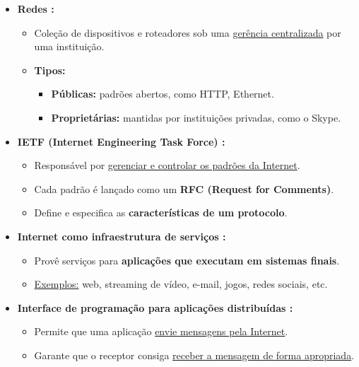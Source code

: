 \begin{itemize}[left=0.5cm, align=left, nosep]
        \item \textbf{Redes :}   
        \begin{itemize}[left=0.5cm, nosep, label=$\hookrightarrow$]
            \item Coleção de dispositivos e roteadores sob uma \underline{gerência centralizada} por uma instituição.  
            \item \textbf{Tipos:}
            \begin{itemize}[left=0.5cm, nosep, label=$-$]
                \item \textbf{Públicas:} padrões abertos, como HTTP, Ethernet.  
                \item \textbf{Proprietárias:} mantidas por instituições privadas, como o Skype.
            \end{itemize}
        \end{itemize} 
        
        \item \textbf{IETF (Internet Engineering Task Force) :}
        \begin{itemize}[left=0.5cm, nosep, label=$\hookrightarrow$]
            \item Responsável por \underline{gerenciar e controlar os padrões da Internet}.  
            \item Cada padrão é lançado como um \textbf{RFC (Request for Comments)}. 
            \item Define e especifica as \textbf{características de um protocolo}. 
        \end{itemize}
        
        \item \textbf{Internet como infraestrutura de serviços :} 
        \begin{itemize}[left=0.5cm, nosep, label=$\hookrightarrow$]
            \item Provê serviços para \textbf{aplicações que executam em sistemas finais}.   
            \item \underline{Exemplos:} web, streaming de vídeo, e-mail, jogos, redes sociais, etc. 
        \end{itemize}
        
        \item \textbf{Interface de programação para aplicações distribuídas :} 
        \begin{itemize}[left=0.5cm, nosep, label=$\hookrightarrow$]
            \item Permite que uma aplicação \underline{envie mensagens pela Internet}. 
            \item Garante que o receptor consiga \underline{receber a mensagem de forma apropriada}.
        \end{itemize}
    \end{itemize}

